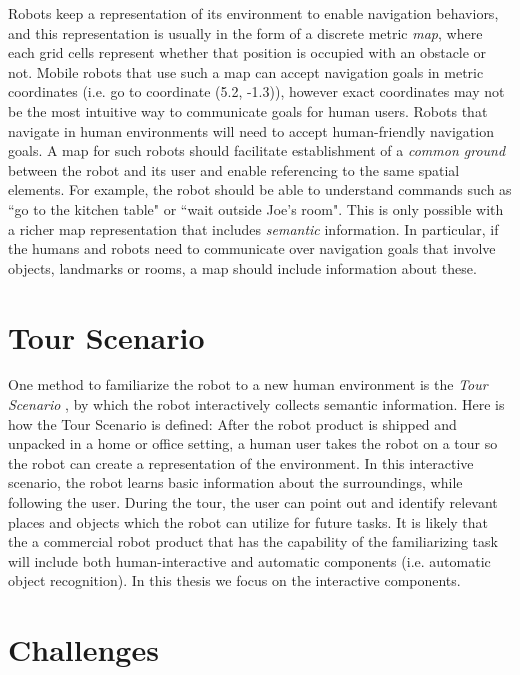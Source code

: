Robots keep a representation of its environment to enable navigation behaviors, and this representation is usually in the form of a discrete metric \textit{map}, where each grid cells represent whether that position is occupied with an obstacle or not. Mobile robots that use such a map can accept navigation goals in metric coordinates (i.e. go to coordinate (5.2, -1.3)), however exact coordinates may not be the most intuitive way to communicate goals for human users. Robots that navigate in human environments will need to accept human-friendly navigation goals. A map for such robots should facilitate establishment of a \textit{common ground} between the robot and its user and enable referencing to the same spatial elements. For example, the robot should be able to understand commands such as ``go to the kitchen table" or ``wait outside Joe's room". This is only possible with a richer map representation that includes \textit{semantic} information. In particular, if the humans and robots need to communicate over navigation goals that involve objects, landmarks or rooms, a map should include information about these.

\section{Tour Scenario}
\label{sec:tour_scenario}

One method to familiarize the robot to a new human environment is the \textit{Tour Scenario} \cite{topp2008human}, by which the robot interactively collects semantic information. Here is how the Tour Scenario is defined: After the robot product is shipped and unpacked in a home or office setting, a human user takes the robot on a tour so the robot can create a representation of the environment. In this interactive scenario, the robot learns basic information about the surroundings, while following the user. During the tour, the user can point out and identify relevant places and objects which the robot can utilize for future tasks. It is likely that the a commercial robot product that has the capability of the familiarizing task will include both human-interactive and automatic components (i.e. automatic object recognition). In this thesis we focus on the interactive components.



\section{Challenges}

